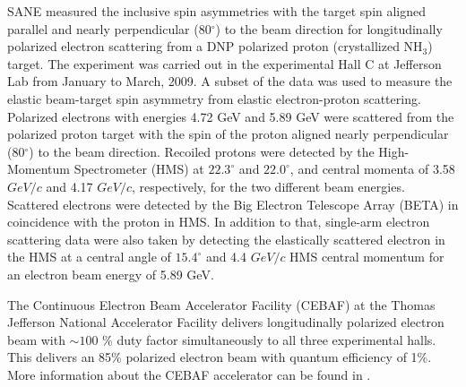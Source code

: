 \documentclass[12pt]{article}
\begin{document}
SANE measured the inclusive spin asymmetries with the target spin aligned parallel and nearly perpendicular (80$^{\circ}$) to the beam direction for longitudinally polarized electron scattering from a DNP polarized proton (crystallized NH$_3$) target. The experiment was carried out in the experimental Hall C at Jefferson Lab from January to March, 2009. A subset of the data was used to measure the elastic beam-target spin asymmetry from elastic electron-proton scattering. Polarized electrons with energies 4.72 GeV and 5.89 GeV were scattered from the polarized proton target with the spin of the proton aligned nearly perpendicular (80$^{\circ}$) to the beam direction. 
Recoiled protons were detected by the High-Momentum Spectrometer (HMS) at $22.3^{\circ}$ and $22.0^{\circ}$, and central momenta of 3.58 $GeV/c$ and 4.17 $GeV/c$, respectively, for the two different beam energies. Scattered electrons were detected by the Big Electron Telescope Array (BETA) in coincidence with the proton in HMS. 
In addition to that, single-arm electron scattering data were also taken by detecting the elastically scattered electron in the HMS at a central angle of $15.4^{\circ}$ and 4.4 $GeV/c$ HMS central momentum for an electron beam energy of 5.89 GeV.

The Continuous Electron Beam Accelerator Facility (CEBAF) at the Thomas Jefferson National Accelerator Facility delivers longitudinally polarized electron beam with $\sim100$ \% duty factor simultaneously to all three experimental halls. This delivers an 85\% polarized electron beam with quantum efficiency of 1\%. More information about the CEBAF accelerator can be found in \cite{100}.
\end{document}
